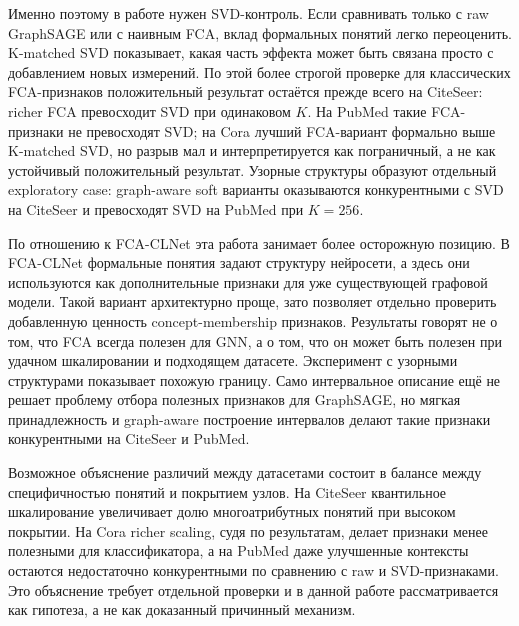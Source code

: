 \documentclass[14pt,a4paper]{extarticle}
\begin{document}
Именно поэтому в работе нужен SVD-контроль. Если сравнивать только с raw
GraphSAGE или с наивным FCA, вклад формальных понятий легко переоценить.
K-matched SVD показывает, какая часть эффекта может быть связана просто с
добавлением новых измерений. По этой более строгой проверке для классических
FCA-признаков положительный результат остаётся прежде всего на CiteSeer: richer
FCA превосходит SVD при одинаковом $K$. На PubMed такие FCA-признаки не
превосходят SVD; на Cora лучший FCA-вариант формально выше K-matched SVD, но
разрыв мал и интерпретируется как пограничный, а не как устойчивый положительный
результат. Узорные структуры образуют отдельный exploratory case: graph-aware
soft варианты оказываются конкурентными с SVD на CiteSeer и превосходят SVD на
PubMed при $K=256$.

По отношению к FCA-CLNet эта работа занимает более осторожную позицию. В
FCA-CLNet формальные понятия задают структуру нейросети, а здесь они используются
как дополнительные признаки для уже существующей графовой модели. Такой вариант
архитектурно проще, зато позволяет отдельно проверить добавленную ценность
concept-membership признаков. Результаты говорят не о том, что FCA всегда полезен
для GNN, а о том, что он может быть полезен при удачном шкалировании и подходящем
датасете. Эксперимент с узорными структурами показывает похожую границу. Само
интервальное описание ещё не решает проблему отбора полезных признаков для
GraphSAGE, но мягкая принадлежность и graph-aware построение интервалов делают
такие признаки конкурентными на CiteSeer и PubMed.

Возможное объяснение различий между датасетами состоит в балансе между
специфичностью понятий и покрытием узлов. На CiteSeer квантильное шкалирование
увеличивает долю многоатрибутных понятий при высоком покрытии. На Cora richer
scaling, судя по результатам, делает признаки менее полезными для классификатора,
а на PubMed даже улучшенные контексты остаются недостаточно конкурентными по
сравнению с raw и SVD-признаками. Это объяснение требует отдельной проверки и в
данной работе рассматривается как гипотеза, а не как доказанный причинный
механизм.
\end{document}
